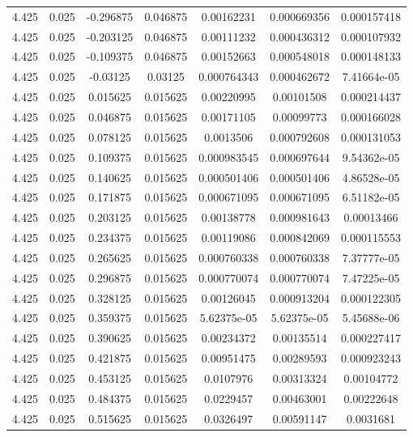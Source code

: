 \begin{table}[bh]
\begin{center}
{\begin{tabular}{ccccccc}
4.425	 & 0.025 & 	-0.296875	 & 0.046875	 & 0.00162231	 & 0.000669356	 & 0.000157418 \\ 
4.425	 & 0.025 & 	-0.203125	 & 0.046875	 & 0.00111232	 & 0.000436312	 & 0.000107932 \\ 
4.425	 & 0.025 & 	-0.109375	 & 0.046875	 & 0.00152663	 & 0.000548018	 & 0.000148133 \\ 
4.425	 & 0.025 & 	-0.03125	 & 0.03125	 & 0.000764343	 & 0.000462672	 & 7.41664e-05 \\ 
4.425	 & 0.025 & 	0.015625	 & 0.015625	 & 0.00220995	 & 0.00101508	 & 0.000214437 \\ 
4.425	 & 0.025 & 	0.046875	 & 0.015625	 & 0.00171105	 & 0.00099773	 & 0.000166028 \\ 
4.425	 & 0.025 & 	0.078125	 & 0.015625	 & 0.0013506	 & 0.000792608	 & 0.000131053 \\ 
4.425	 & 0.025 & 	0.109375	 & 0.015625	 & 0.000983545	 & 0.000697644	 & 9.54362e-05 \\ 
4.425	 & 0.025 & 	0.140625	 & 0.015625	 & 0.000501406	 & 0.000501406	 & 4.86528e-05 \\ 
4.425	 & 0.025 & 	0.171875	 & 0.015625	 & 0.000671095	 & 0.000671095	 & 6.51182e-05 \\ 
4.425	 & 0.025 & 	0.203125	 & 0.015625	 & 0.00138778	 & 0.000981643	 & 0.00013466 \\ 
4.425	 & 0.025 & 	0.234375	 & 0.015625	 & 0.00119086	 & 0.000842069	 & 0.000115553 \\ 
4.425	 & 0.025 & 	0.265625	 & 0.015625	 & 0.000760338	 & 0.000760338	 & 7.37777e-05 \\ 
4.425	 & 0.025 & 	0.296875	 & 0.015625	 & 0.000770074	 & 0.000770074	 & 7.47225e-05 \\ 
4.425	 & 0.025 & 	0.328125	 & 0.015625	 & 0.00126045	 & 0.000913204	 & 0.000122305 \\ 
4.425	 & 0.025 & 	0.359375	 & 0.015625	 & 5.62375e-05	 & 5.62375e-05	 & 5.45688e-06 \\ 
4.425	 & 0.025 & 	0.390625	 & 0.015625	 & 0.00234372	 & 0.00135514	 & 0.000227417 \\ 
4.425	 & 0.025 & 	0.421875	 & 0.015625	 & 0.00951475	 & 0.00289593	 & 0.000923243 \\ 
4.425	 & 0.025 & 	0.453125	 & 0.015625	 & 0.0107976	 & 0.00313324	 & 0.00104772 \\ 
4.425	 & 0.025 & 	0.484375	 & 0.015625	 & 0.0229457	 & 0.00463001	 & 0.00222648 \\ 
4.425	 & 0.025 & 	0.515625	 & 0.015625	 & 0.0326497	 & 0.00591147	 & 0.0031681 \\ 

\end{tabular}}
\end{center}
\end{table}
